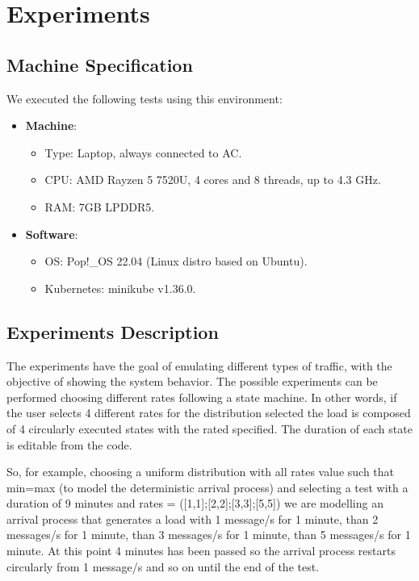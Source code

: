 \section{Experiments}

\subsection{Machine Specification}
We executed the following tests using this environment:
\begin{itemize}
    \item \textbf{Machine}:
    \begin{itemize}
        \item Type: Laptop, always connected to AC.
        \item CPU: AMD Rayzen 5 7520U, 4 cores and 8 threads, up to 4.3 GHz.
        \item RAM: 7GB LPDDR5.
    \end{itemize}
    \item \textbf{Software}:
    \begin{itemize}
        \item OS: Pop!\_OS 22.04 (Linux distro based on Ubuntu).
        \item Kubernetes: minikube v1.36.0.
    \end{itemize}
\end{itemize}

\subsection{Experiments Description}
The experiments have the goal of emulating different types of traffic, with the objective of showing the system behavior. The possible experiments can be performed choosing different rates following a state machine. In other words, if the user selects 4 different rates for the distribution selected the load is composed of 4 circularly executed states with the rated specified. The duration of each state is editable from the code.

So, for example, choosing a uniform distribution with all rates value such that min=max (to model the deterministic arrival process) and selecting a test with a duration of 9 minutes and rates = ([1,1];[2,2];[3,3];[5,5]) we are modelling an arrival process that generates a load with 1 message/s for 1 minute, than 2 messages/s for 1 minute, than 3 messages/s for 1 minute, than 5 messages/s for 1 minute. At this point 4 minutes has been passed so the arrival process restarts circularly from 1 message/s and so on until the end of the test.

